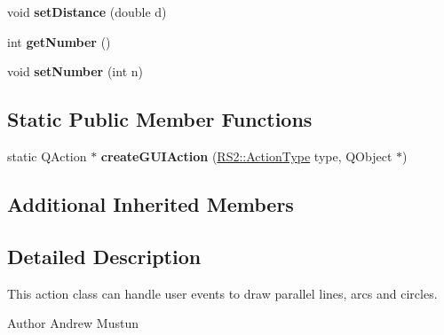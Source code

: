 \begin{DoxyCompactItemize}
\item 
\hypertarget{classRS__ActionDrawLineParallel_aef9d19dbe461361516e7555b871f5467}{void {\bfseries set\-Distance} (double d)}\label{classRS__ActionDrawLineParallel_aef9d19dbe461361516e7555b871f5467}

\item 
\hypertarget{classRS__ActionDrawLineParallel_a9849a78bf3aafbeb35e27dde994a3144}{int {\bfseries get\-Number} ()}\label{classRS__ActionDrawLineParallel_a9849a78bf3aafbeb35e27dde994a3144}

\item 
\hypertarget{classRS__ActionDrawLineParallel_ae940b8a25bf78427577dfd6601879e5a}{void {\bfseries set\-Number} (int n)}\label{classRS__ActionDrawLineParallel_ae940b8a25bf78427577dfd6601879e5a}

\end{DoxyCompactItemize}
\subsection*{Static Public Member Functions}
\begin{DoxyCompactItemize}
\item 
\hypertarget{classRS__ActionDrawLineParallel_ac71252ce9d01ec02d46af013ab7db29f}{static Q\-Action $\ast$ {\bfseries create\-G\-U\-I\-Action} (\hyperlink{classRS2_afe3523e0bc41fd637b892321cfc4b9d7}{R\-S2\-::\-Action\-Type} type, Q\-Object $\ast$)}\label{classRS__ActionDrawLineParallel_ac71252ce9d01ec02d46af013ab7db29f}

\end{DoxyCompactItemize}
\subsection*{Additional Inherited Members}


\subsection{Detailed Description}
This action class can handle user events to draw parallel lines, arcs and circles.

\begin{DoxyAuthor}{Author}
Andrew Mustun 
\end{DoxyAuthor}


